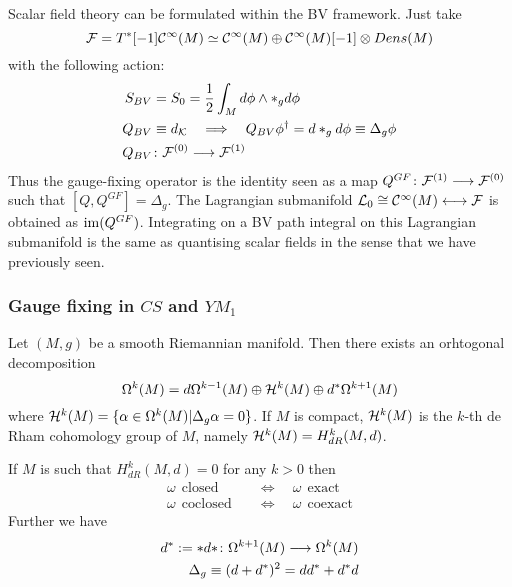 \begin{rem}
  Scalar field theory can be formulated within the BV framework. Just take
  \begin{equation}
    {\mathcal{F}} = T^*[-1] \mathcal{C}^{\infty}(M) \simeq \mathcal{C}^{\infty}(M) \oplus \mathcal{C}^{\infty}(M)[-1] \otimes Dens(M)
  \end{equation}
  with the following action:
  \begin{align}
    S_{BV} &= S_0 = \frac{1}{2} \int_M d\phi \wedge *_g d\phi \\
    Q_{BV} &\equiv d_\KK \quad \Lra \quad Q_{BV} \phi^\dagger = d *_g d\phi \equiv \Delta_g \phi \\
    Q_{BV} &\colon \FF^{(0)} \lra \FF^{(1)}
  \end{align}
  Thus the gauge-fixing operator is the identity seen as a map $Q^{GF} \colon {\mathcal{F}}^{(1)} \longrightarrow {\mathcal{F}}^{(0)}$ such that $[Q, Q^{GF}] = \Delta_g$. The Lagrangian submanifold $\mathcal{L}_0 \cong \mathcal{C}^{\infty}(M) \longleftrightarrow {\mathcal{F}}$ is obtained as $\operatorname{im}(Q^{GF})$. Integrating on a BV path integral on this Lagrangian submanifold is the same as quantising scalar fields in the sense that we have previously seen.
\end{rem}

\subsubsection{Gauge fixing in $CS$ and $YM_1$}

\begin{theo}
  Let $(M,g)$ be a smooth Riemannian manifold. Then there exists an orhtogonal decomposition
  \begin{equation}
    \Omega^k(M) = d\Omega^{k-1}(M) \oplus {\mathcal{H}}^k(M) \oplus d^* \Omega^{k+1}(M)
  \end{equation}
  where ${\mathcal{H}}^k(M) = \{\alpha \in \Omega^k(M) | \Delta_g \alpha = 0 \}$. If $M$ is compact, ${\mathcal{H}}^k(M)$ is the $k$-th de Rham cohomology group of $M$, namely ${\mathcal{H}}^k(M) = H^k_{dR}(M,d)$.
\end{theo}

\begin{rem}
  If $M$ is such that $H^k_{dR}(M,d) = 0$ for any $k > 0$ then
  \begin{align}
    \omega \ \ \text{closed} \quad &\Longleftrightarrow \quad \omega \ \ \text{exact} \\
    \omega \ \ \text{coclosed} \quad &\Longleftrightarrow \quad \omega \ \ \text{coexact}
  \end{align}
  Further we have
  \begin{align}
    d^* := * d * \colon \Omega^{k+1}(M) \longrightarrow \Omega^{k}(M) \\
    \Delta_g \equiv (d + d^*)^2 = dd^* + d^* d
  \end{align}
\end{rem}

